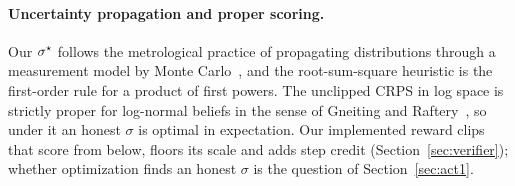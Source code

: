 \paragraph{Uncertainty propagation and proper scoring.}
Our $\sigma^{\star}$ follows the metrological practice of propagating distributions through a measurement model by Monte
Carlo~\citep{jcgm101}, and the root-sum-square heuristic is the first-order rule for a product of first powers.
The unclipped CRPS in log space is strictly proper for log-normal beliefs in the sense of Gneiting and
Raftery~\citep{gneiting2007strictly}, so under it an honest $\sigma$ is optimal in expectation.
Our implemented reward clips that score from below, floors its scale and adds step credit
(Section~\ref{sec:verifier}); whether optimization finds an honest $\sigma$ is the question of Section~\ref{sec:act1}.

